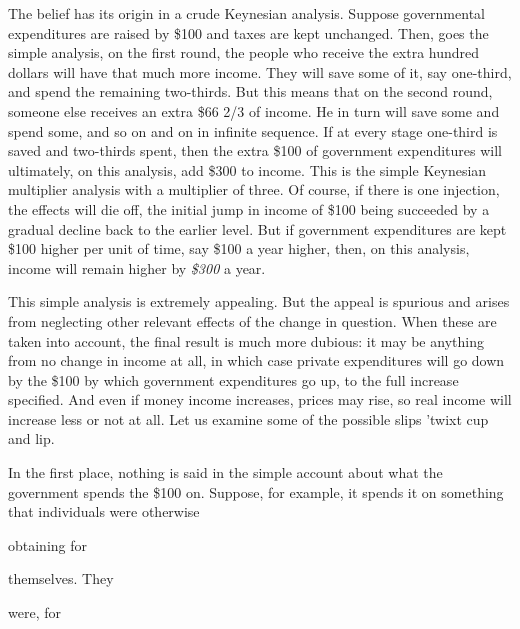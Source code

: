 \documentclass[11pt,openany]{book}
\begin{document}
The belief has its origin in a crude Keynesian analysis. Suppose governmental expenditures are raised by \$100 and taxes are kept unchanged. Then, goes the simple analysis, on the first round, the people who receive the extra hundred dollars will have that much more income. They will save some of it, say one-third, and spend the remaining two-thirds. But this means that on the second round, someone else receives an extra \$66 2/3 of income. He in turn will save some and spend some, and so on and on in infinite sequence. If at every stage one-third is saved and two-thirds spent, then the extra \$100 of government expenditures will ultimately, on this analysis, add \$300 to income. This is the simple Keynesian multiplier analysis with a multiplier of three. Of course, if there is one injection, the effects will die off, the initial jump in income of \$100 being succeeded by a gradual decline back to the earlier level. But if government expenditures are kept \$100 higher per unit of time, say \$100 a year higher, then, on this analysis, income will remain higher by \emph{\$300} a year.

This simple analysis is extremely appealing. But the appeal is spurious and arises from neglecting other relevant effects of the change in question. When these are taken into account, the final result is much more dubious: it may be anything from no change in income at all, in which case private expenditures will go down by the \$100 by which government expenditures go up, to the full increase specified. And even if money income increases, prices may rise, so real income will increase less or not at all. Let us examine some of the possible slips 'twixt cup and lip.

In the first place, nothing is said in the simple account about what the government spends the \$100 on. Suppose, for example, it spends it on something that individuals were otherwise

obtaining for

themselves. They

were, for
\end{document}
